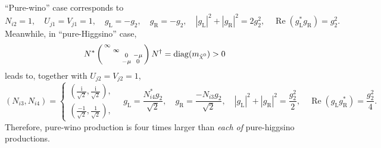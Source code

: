 \documentclass[a4paper,10pt,captions=tableheading,DIV=14]{scrartcl}
\numberwithin{equation}{section}
\newcommand\w[1]{_{\mathrm{#1}}}
\newcommand\ii{\mathrm{i}}
\DeclareMathOperator{\diag}{\mathrm{diag}}
\renewcommand{\Re}{\mathop{\mathrm{Re}}}
\newcommand\neut  [1][\relax]{{\tilde\chi^0_{#1}}}
\newcommand{\gL}{g\w L}
\newcommand{\gR}{g\w R}
\begin{document}
``Pure-wino'' case corresponds to
\begin{equation}
 N_{i2}=1,\quad U_{j1}=V_{j1}=1,\quad
 \gL = -g_2, \quad \gR = -g_2,\quad
|\gL|^2+|\gR|^2=2g_2^2,\quad
\Re(\gL^*\gR) = g_2^2.
\end{equation}
Meanwhile, in ``pure-Higgsino'' case, 
\begin{equation}
 N^*\left(
\begin{smallmatrix}
\infty & & & \\ & \infty & & \\ & & 0 & -\mu \\ & & -\mu & 0
\end{smallmatrix}
\right)
N^\dagger = \diag(m_{\neut})>0
\end{equation}
leads to, together with $U_{j2}=V_{j2}=1$,
\begin{equation}
 (N_{i3}, N_{i4})=
\begin{cases}
 (\frac{\ii}{\sqrt2},\frac{\ii}{\sqrt2}),\\
 (\frac{-1}{\sqrt2},\frac1{\sqrt2}),
\end{cases}
\quad \gL = \frac{N^*_{i4}g_2}{\sqrt2}, \quad \gR = \frac{-N_{i3}g_2}{\sqrt2},
\quad
 |\gL|^2+|\gR|^2=\frac{g_2^2}{2},
\quad
\Re(\gL\gR^*)=\frac{g_2^2}{4}.
\end{equation}
Therefore, pure-wino production is four times larger than \emph{each of} pure-higgsino productions.
\end{document}
